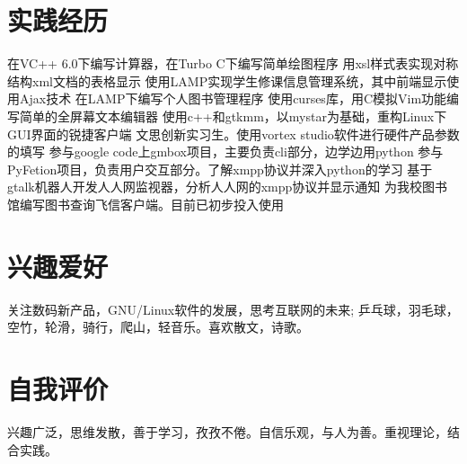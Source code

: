 \documentclass[a4paper]{moderncvwutao}
\begin{document}
\begin{CJK*}{UTF8}{gbsn}
\section{实践经历}
{ 在VC++ 6.0下编写计算器，在Turbo C下编写简单绘图程序 }
{ 用xsl样式表实现对称结构xml文档的表格显示 }
{ 使用LAMP实现学生修课信息管理系统，其中前端显示使用Ajax技术 }
{ 在LAMP下编写个人图书管理程序 }
{ 使用curses库，用C模拟Vim功能编写简单的全屏幕文本编辑器 }
{ 使用c++和gtkmm，以mystar为基础，重构Linux下GUI界面的锐捷客户端 }
{ 文思创新实习生。使用vortex studio软件进行硬件产品参数的填写 }
{	参与google code上gmbox项目，主要负责cli部分，边学边用python }
{ 参与PyFetion项目，负责用户交互部分。了解xmpp协议并深入python的学习}
{基于gtalk机器人开发人人网监视器，分析人人网的xmpp协议并显示通知}
{	为我校图书馆编写图书查询飞信客户端。目前已初步投入使用}
\section{兴趣爱好}
\cvitem{}
{
	\small 关注数码新产品，GNU/Linux软件的发展，思考互联网的未来;
	乒乓球，羽毛球，空竹，轮滑，骑行，爬山，轻音乐。喜欢散文，诗歌。
}
\section{自我评价}
\cvitem{}{}
{
	兴趣广泛，思维发散，善于学习，孜孜不倦。自信乐观，与人为善。重视理论，结合实践。
}
\closesection
\end{CJK*}
\end{document}
